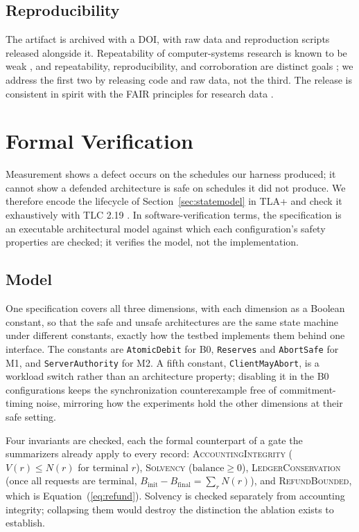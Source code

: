 \documentclass[final,5p,times,twocolumn,number]{elsarticle}
\begin{document}
\subsection{Reproducibility}
The artifact is archived with a DOI, with raw data and reproduction scripts released
alongside it. Repeatability of computer-systems research is known to be weak
\citep{collberg}, and repeatability, reproducibility, and corroboration are distinct
goals \citep{feitelson}; we address the first two by releasing code and raw data, not the
third. The release is consistent in spirit with the FAIR principles for research data
\citep{fair}.

\section{Formal Verification}
\label{sec:formal}
Measurement shows a defect occurs on the schedules our harness produced; it cannot show a
defended architecture is safe on schedules it did not produce. We therefore encode the
lifecycle of Section~\ref{sec:statemodel} in TLA+ \citep{tla} and check it exhaustively
with TLC 2.19 \citep{tlc}. In software-verification terms, the specification is an
executable architectural model against which each configuration's safety properties are
checked; it verifies the model, not the implementation.

\subsection{Model}
One specification covers all three dimensions, with each dimension as a Boolean constant,
so that the safe and unsafe architectures are the same state machine under different
constants, exactly how the testbed implements them behind one interface. The constants
are \texttt{AtomicDebit} for B0, \texttt{Reserves} and \texttt{AbortSafe} for M1, and
\texttt{ServerAuthority} for M2. A fifth constant, \texttt{ClientMayAbort}, is a workload
switch rather than an architecture property; disabling it in the B0 configurations keeps
the synchronization counterexample free of commitment-timing noise, mirroring how the
experiments hold the other dimensions at their safe setting.

Four invariants are checked, each the formal counterpart of a gate the summarizers
already apply to every record: \textsc{AccountingIntegrity} ($V(r) \le N(r)$ for terminal
$r$), \textsc{Solvency} ($\mathrm{balance} \ge 0$), \textsc{LedgerConservation} (once all
requests are terminal, $B_{\mathrm{init}} - B_{\mathrm{final}} = \sum_r N(r)$), and
\textsc{RefundBounded}, which is Equation~(\ref{eq:refund}). Solvency is checked
separately from accounting integrity; collapsing them would destroy the distinction the
ablation exists to establish.
\end{document}
